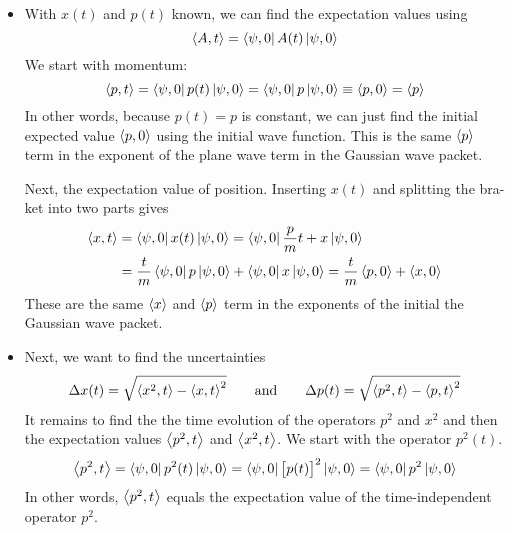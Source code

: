 \documentclass[11pt, a4paper]{article}
\newcommand{\eqtext}[1]{\qquad \text{#1} \qquad}
\begin{document}
\begin{itemize}
	\item With $ x(t) $ and $ p(t) $ known, we can find the expectation values using
	\begin{equation*}
		\ev{A, t} = \bra{\psi, 0} A(t) \ket{\psi, 0}
	\end{equation*}
	We start with momentum:
	\begin{equation*}
		\ev{p, t} = \bra{\psi, 0} p(t) \ket{\psi, 0} = \bra{\psi, 0} p \ket{\psi, 0} \equiv \ev{p, 0} = \ev{p}
	\end{equation*}
	In other words, because $ p(t) = p $ is constant, we can just find the initial expected value $ \ev{p, 0} $ using the initial wave function. This is the same $ \ev{p} $ term in the exponent of the plane wave term in the Gaussian wave packet. 
	
	Next, the expectation value of position. Inserting $ x(t) $  and splitting the bra-ket into two parts gives
	\begin{align*}
		\ev{x, t} &= \bra{\psi, 0} x(t) \ket{\psi, 0} = \bra{\psi, 0} \frac{p}{m}t + x \ket{\psi, 0} \\
		&= \frac{t}{m}\bra{\psi, 0} p \ket{\psi, 0} + \bra{\psi, 0} x \ket{\psi, 0} = \frac{t}{m}\ev{p, 0} + \ev{x, 0}
	\end{align*}
	These are the same  $ \ev{x} $ and $ \ev{p} $ term in the exponents of the initial the Gaussian wave packet. 
	
	\item Next, we want to find the uncertainties
	\begin{equation*}
		\Delta x(t) = \sqrt{\ev{x^{2}, t} - \ev{x, t}^{2}} \eqtext{and} \Delta p(t) = \sqrt{\ev{p^{2}, t} - \ev{p, t}^{2}}
	\end{equation*}
	It remains to find the the time evolution of the operators $ p^{2} $ and $ x^{2} $ and then the expectation values $ \ev{p^{2}, t} $ and $ \ev{x^{2}, t} $. We start with the operator $ p^{2}(t) $. 
	\begin{equation*}
		\ev{p^{2}, t} = \bra{\psi, 0} p^{2}(t) \ket{\psi, 0} = \bra{\psi, 0} \big[p(t)\big]^{2} \ket{\psi, 0} = \bra{\psi, 0} p^{2} \ket{\psi, 0}
	\end{equation*}
	In other words, $ \ev{p^{2}, t} $ equals the expectation value of the time-independent operator $ p^{2} $. 
	

\end{itemize}
\end{document}
